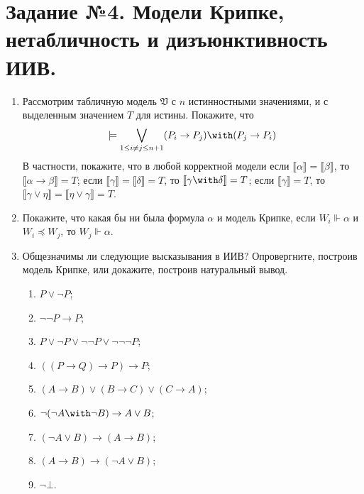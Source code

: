 \documentclass[10pt,a4paper,oneside]{article}
\begin{document}
\section*{Задание №4. Модели Крипке, нетабличность и дизъюнктивность ИИВ.}

\begin{enumerate}
\item Рассмотрим табличную модель $\mathfrak{V}$ с $n$ истинностными значениями, 
и с выделенным значением $T$ для истины.
Покажите, что $$\models\bigvee_{1 \le i\ne j \le n+1} (P_i \rightarrow P_j)\with(P_j\rightarrow P_i)$$
В частности, покажите, что в любой корректной модели если $\llbracket\alpha\rrbracket = \llbracket\beta\rrbracket$, то
$\llbracket\alpha\rightarrow\beta\rrbracket = T$; если $\llbracket\gamma\rrbracket = \llbracket\delta\rrbracket = T$, то
$\llbracket\gamma\with\delta\rrbracket = T$;
если $\llbracket\gamma\rrbracket = T$, то $\llbracket\gamma\vee\eta\rrbracket = \llbracket\eta\vee\gamma\rrbracket = T$.

\item Покажите, что какая бы ни была формула $\alpha$ и модель Крипке,
если $W_i \Vdash \alpha$ и $W_i \preceq W_j$, то $W_j \Vdash \alpha$.

\item Общезначимы ли следующие высказывания в ИИВ? Опровергните, построив модель Крипке, или докажите, построив натуральный вывод. 
\begin{enumerate}
\item $P \vee \neg P$;
\item $\neg\neg P \rightarrow P$;
\item $P \vee \neg P \vee \neg\neg P \vee \neg\neg\neg P$;
\item $((P \rightarrow Q) \rightarrow P) \rightarrow P$;
\item $(A \rightarrow B) \vee (B \rightarrow C) \vee (C \rightarrow A)$;
\item $\neg(\neg A \with \neg B) \rightarrow A \vee B$;
\item $(\neg A \vee B) \rightarrow (A \rightarrow B)$;
\item $(A \rightarrow B) \rightarrow (\neg A \vee B)$;
\item $\neg\bot$.
\end{enumerate}


\end{enumerate}
\end{document}
